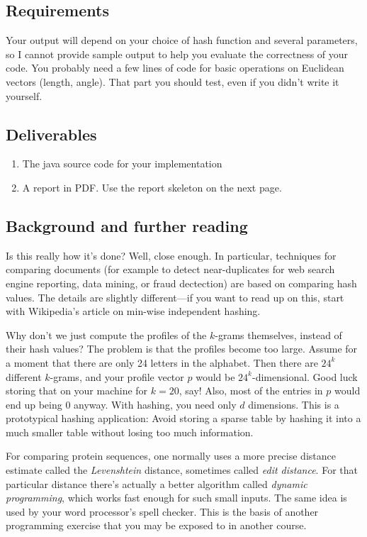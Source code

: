 \documentclass{tufte-handout}
\begin{document}
\subsection{Requirements}

Your output will depend on your choice of hash function and several parameters, so I cannot provide sample output to help you evaluate the correctness of your code.
You probably need a few lines of code for basic operations on Euclidean vectors (length, angle).
That part you should test, even if you didn't write it yourself.

\subsection{Deliverables}

\begin{enumerate}
  \item The java source code for your implementation
  \item A report in PDF.
  Use the report skeleton on the next page.
  \end{enumerate}

\subsection{Background and further reading}

Is this really how it’s done?
Well, close enough.
In particular, techniques for comparing documents (for
example to detect near-duplicates for web search engine
reporting, data mining, or fraud dectection) are based on
comparing hash values.
The details are slightly different---if you want to read up on this, start with Wikipedia’s article on min-wise independent hashing.

Why don't we just compute the profiles of the $k$-grams themselves, instead of their hash values?
The problem is that the profiles become too large.
Assume for a moment that there are only 24 letters in the alphabet.
Then there are $24^k$ different $k$-grams, and your profile vector $p$ would be $24^k$-dimensional.
Good luck storing that on your machine for $k=20$, say!
Also, most of the entries in $p$ would end up being $0$ anyway.
With hashing, you need only $d$ dimensions.
This is a prototypical hashing application:
Avoid storing a sparse table by hashing it into a much smaller table without losing too much information.

\medskip
For comparing protein sequences, one normally uses a more
precise distance estimate called the \emph{Levenshtein} distance,
sometimes called \emph{edit distance}.
For that particular distance there's actually a better algorithm called \emph{dynamic
programming}, which works fast enough for such small inputs.
The same idea is used by your word processor’s spell
checker.
This is the basis of another programming exercise that you may be exposed to in another course.
\end{document}
